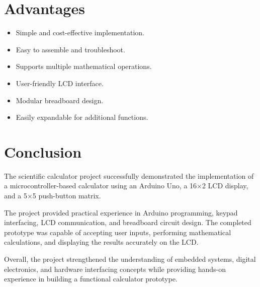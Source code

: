 \documentclass[12pt,a4paper]{article}
\begin{document}

\section{Advantages}

\begin{itemize}

\item Simple and cost-effective implementation.

\item Easy to assemble and troubleshoot.

\item Supports multiple mathematical operations.

\item User-friendly LCD interface.

\item Modular breadboard design.

\item Easily expandable for additional functions.

\end{itemize}


\section{Conclusion}

The scientific calculator project successfully demonstrated the implementation of a microcontroller-based calculator using an Arduino Uno, a 16×2 LCD display, and a 5×5 push-button matrix.

The project provided practical experience in Arduino programming, keypad interfacing, LCD communication, and breadboard circuit design. The completed prototype was capable of accepting user inputs, performing mathematical calculations, and displaying the results accurately on the LCD.

Overall, the project strengthened the understanding of embedded systems, digital electronics, and hardware interfacing concepts while providing hands-on experience in building a functional calculator prototype.
\end{document}
